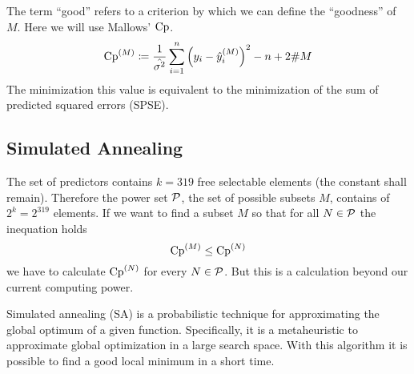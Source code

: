 		The term \enquote{good} refers to a criterion by which we can define the \enquote{goodness} of $M$.
		Here we will use Mallows' $\mathrm{Cp}$.
		\[
			\mathrm{Cp}^{(M)} \coloneqq \frac{1}{\hat{\sigma^2}}\sum_{i=1}^n\left( y_i-\hat{y}^{(M)}_i \right)^2 - n + 2\#M
		\]
		The minimization this value is equivalent to the minimization of the sum of predicted squared errors (SPSE).
	

	\subsection{Simulated Annealing}
	\label{ssec:simulated-annealing}
	
		The set of predictors contains $k=319$ free selectable elements (the constant shall remain).
		Therefore the power set $\mathcal{P}$, the set of possible subsets $M$, contains of $2^{k}=2^{319}$ elements.
		If we want to find a subset $M$ so that for all $N\in\mathcal{P}$ the inequation holds
		\[
			\mathrm{Cp}^{(M)} \leq \mathrm{Cp}^{(N)}
		\]
		we have to calculate $\mathrm{Cp}^{(N)}$ for every $N\in\mathcal{P}$.
		But this is a calculation beyond our current computing power.

		Simulated annealing (SA) is a probabilistic technique for approximating the global optimum of a given function.
		Specifically, it is a metaheuristic to approximate global optimization in a large search space.
		With this algorithm it is possible to find a good local minimum in a short time.
	

